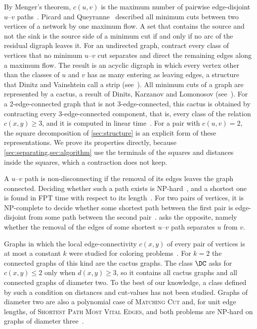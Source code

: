 By Menger's theorem, $c(u, v)$ is the maximum number of pairwise edge-disjoint $u$--$v$ paths~\cite[Corollary~3.3.5]{Diestel2025}.
Picard and Queyranne~\cite{PicardQueyranne1980} described all minimum cuts between two vertices of a network by one maximum flow.
A set that contains the source and not the sink is the source side of a minimum cut if and only if no arc of the residual digraph leaves it.
For an undirected graph, contract every class of vertices that no minimum $u$--$v$ cut separates and direct the remaining edges along a maximum flow.
The result is an acyclic digraph in which every vertex other than the classes of $u$ and $v$ has as many entering as leaving edges, a structure that Dinitz and Vainshtein call a strip (see~\cite{BaswanaPandey2025Carcass}).
All minimum cuts of a graph are represented by a cactus, a result of Dinits, Karzanov and Lomonosov (see~\cite{NagamochiKameda1996}).
For a 2-edge-connected graph that is not 3-edge-connected, this cactus is obtained by contracting every 3-edge-connected component, that is, every class of the relation $c(x, y) \geq 3$, and it is computed in linear time~\cite{Mehlhorn2017Certifying}.
For a pair with $c(u, v) = 2$, the square decomposition of \cref{sec:structure} is an explicit form of these representations.
We prove its properties directly, because \cref{sec:separating,sec:algorithm} use the terminals of the squares and distances inside the squares, which a contraction does not keep.

A $u$--$v$ path is non-disconnecting if the removal of its edges leaves the graph connected.
Deciding whether such a path exists is NP-hard~\cite{Mao2021NonSeparating}, and a shortest one is found in FPT time with respect to its length~\cite{Abhinav2022NonSeparating}.
For two pairs of vertices, it is NP-complete to decide whether some shortest path between the first pair is edge-disjoint from some path between the second pair~\cite{EilamTzoreff1998Disjoint}.
\SSP{} asks the opposite, namely whether the removal of the edges of some shortest $u$--$v$ path separates $u$ from $v$.

Graphs in which the local edge-connectivity $c(x, y)$ of every pair of vertices is at most a constant $k$ were studied for coloring problems~\cite{Aboulker2017Coloring}.
For $k = 2$ the connected graphs of this kind are the cactus graphs.
The class $\DC$ asks for $c(x, y) \leq 2$ only when $d(x, y) \geq 3$, so it contains all cactus graphs and all connected graphs of diameter two.
To the best of our knowledge, a class defined by such a condition on distances and cut-values has not been studied.
Graphs of diameter two are also a polynomial case of \textsc{Matching Cut} and, for unit edge lengths, of \textsc{Shortest Path Most Vital Edges}, and both problems are NP-hard on graphs of diameter three~\cite{LeLe2019MatchingCut,Bazgan2019MostVital}.

